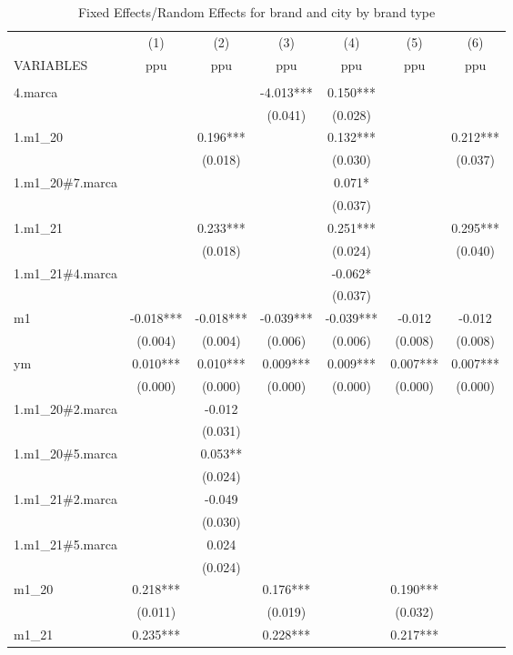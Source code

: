 \begin{longtable}{lcccccc} 
	\caption{Fixed Effects/Random Effects for brand and city by brand type}\label{tab:xt2}\\	
	\hline
 & (1) & (2) & (3) & (4) & (5) & (6) \\
VARIABLES & ppu & ppu & ppu & ppu & ppu & ppu \\ \hline
 &  &  &  &  &  &  \\
4.marca &  &  & -4.013*** & 0.150*** &  &  \\
 &  &  & (0.041) & (0.028) &  &  \\
1.m1\_20 &  & 0.196*** &  & 0.132*** &  & 0.212*** \\
 &  & (0.018) &  & (0.030) &  & (0.037) \\
1.m1\_20\#7.marca &  &  &  & 0.071* &  &  \\
 &  &  &  & (0.037) &  &  \\
1.m1\_21 &  & 0.233*** &  & 0.251*** &  & 0.295*** \\
 &  & (0.018) &  & (0.024) &  & (0.040) \\
1.m1\_21\#4.marca &  &  &  & -0.062* &  &  \\
 &  &  &  & (0.037) &  &  \\
m1 & -0.018*** & -0.018*** & -0.039*** & -0.039*** & -0.012 & -0.012 \\
 & (0.004) & (0.004) & (0.006) & (0.006) & (0.008) & (0.008) \\
ym & 0.010*** & 0.010*** & 0.009*** & 0.009*** & 0.007*** & 0.007*** \\
 & (0.000) & (0.000) & (0.000) & (0.000) & (0.000) & (0.000) \\
1.m1\_20\#2.marca &  & -0.012 &  &  &  &  \\
 &  & (0.031) &  &  &  &  \\
1.m1\_20\#5.marca &  & 0.053** &  &  &  &  \\
 &  & (0.024) &  &  &  &  \\
1.m1\_21\#2.marca &  & -0.049 &  &  &  &  \\
 &  & (0.030) &  &  &  &  \\
1.m1\_21\#5.marca &  & 0.024 &  &  &  &  \\
 &  & (0.024) &  &  &  &  \\
m1\_20 & 0.218*** &  & 0.176*** &  & 0.190*** &  \\
 & (0.011) &  & (0.019) &  & (0.032) &  \\
m1\_21 & 0.235*** &  & 0.228*** &  & 0.217*** &  \\

\end{longtable}
